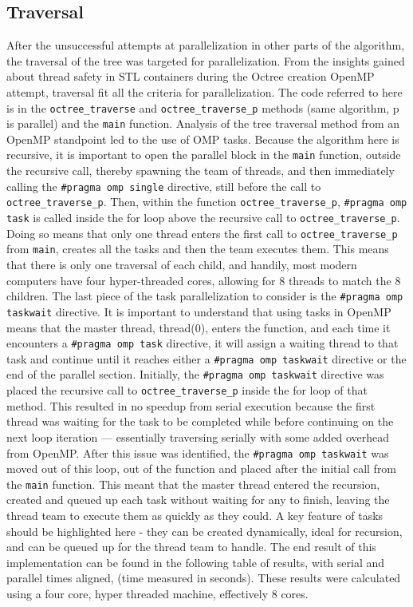 \documentclass[11pt]{article}
\begin{document}
\subsection{Traversal}
After the unsuccessful attempts at parallelization in other parts of the algorithm, the traversal of the tree was targeted for parallelization. From the insights gained about thread safety in STL containers during the Octree creation OpenMP attempt, traversal fit all the criteria for parallelization. The code referred to here is in the \texttt{octree\_traverse} and \texttt{octree\_traverse\_p} methods (same algorithm, p is parallel) and the \texttt{main} function. Analysis of the tree traversal method from an OpenMP standpoint led to the use of OMP tasks. Because the algorithm here is recursive, it is important to open the parallel block in the \texttt{main} function, outside the recursive call, thereby spawning the team of threads, and then immediately calling the \texttt{\#pragma omp single} directive, still before the call to \texttt{octree\_traverse\_p}. Then, within the function \texttt{octree\_traverse\_p}, \texttt{\#pragma omp task} is called inside the for loop above the recursive call to \texttt{octree\_traverse\_p}. Doing so means that only one thread enters the first call to \texttt{octree\_traverse\_p} from \texttt{main}, creates all the tasks and then the team executes them. This means that there is only one traversal of each child, and handily, most modern computers have four hyper-threaded cores, allowing for 8 threads to match the 8 children. The last piece of the task parallelization to consider is the \texttt{\#pragma omp taskwait} directive. It is important to understand that using tasks in OpenMP means that the master thread, thread(0), enters the function, and each time it encounters a \texttt{\#pragma omp task} directive, it will assign a waiting thread to that task and continue until it reaches either a \texttt{\#pragma omp taskwait} directive or the end of the parallel section. Initially, the \texttt{\#pragma omp taskwait} directive was placed the recursive call to \texttt{octree\_traverse\_p} inside the for loop of that method. This resulted in no speedup from serial execution because the first thread was waiting for the task to be completed while before continuing on the next loop iteration --- essentially traversing serially with some added overhead from OpenMP. After this issue was identified, the \texttt{\#pragma omp taskwait} was moved out of this loop, out of the function and placed after the initial call from the \texttt{main} function. This meant that the master thread entered the recursion, created and queued up each task without waiting for any to finish, leaving the thread team to execute them as quickly as they could. A key feature of tasks should be highlighted here - they can be created dynamically, ideal for recursion, and can be queued up for the thread team to handle. The end result of this implementation can be found in the following table of results, with serial and parallel times aligned, (time measured in seconds). These results were calculated using a four core, hyper threaded machine, effectively 8 cores.
\end{document}
